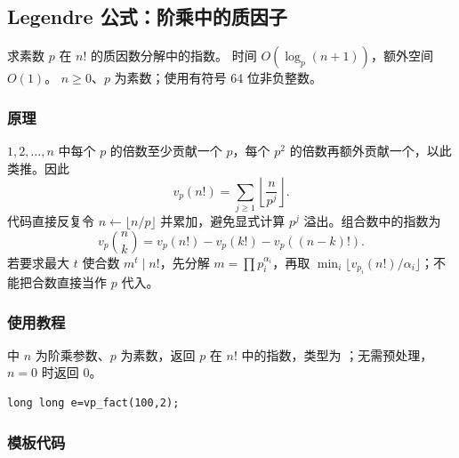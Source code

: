 \subsection{Legendre 公式：阶乘中的质因子}
\label{algo:legendre}
\AlgorithmInfo
    {求素数 $p$ 在 $n!$ 的质因数分解中的指数。}
    {时间 $O(\log_p(n+1))$，额外空间 $O(1)$。}
    {$n\geq0$、$p$ 为素数；使用有符号 64 位非负整数。}

\subsubsection*{原理}
$1,2,\ldots,n$ 中每个 $p$ 的倍数至少贡献一个 $p$，每个 $p^2$ 的倍数再额外贡献一个，以此类推。因此
\[
    v_p(n!)=\sum_{j\geq1}\left\lfloor\frac n{p^j}\right\rfloor.
\]
代码直接反复令 $n\gets\lfloor n/p\rfloor$ 并累加，避免显式计算 $p^j$ 溢出。组合数中的指数为
\[
    v_p\binom nk=v_p(n!)-v_p(k!)-v_p((n-k)!).
\]
若要求最大 $t$ 使合数 $m^t\mid n!$，先分解 $m=\prod p_i^{\alpha_i}$，再取 $\min_i\lfloor v_{p_i}(n!)/\alpha_i\rfloor$；不能把合数直接当作 $p$ 代入。

\subsubsection*{使用教程}
 中 $n$ 为阶乘参数、$p$ 为素数，返回 $p$ 在 $n!$ 中的指数，类型为 ；无需预处理，$n=0$ 时返回 0。
\begin{lstlisting}[style=mtycpp,numbers=none]
long long e=vp_fact(100,2);
\end{lstlisting}

\subsubsection*{模板代码}
